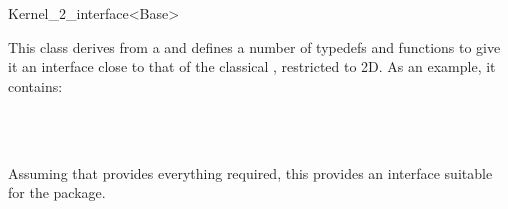 \begin{ccRefClass}{Kernel_2_interface<Base>}

\ccDefinition
This class derives from a   and defines a number
of typedefs and functions to give it an interface close to that of the
classical , restricted to 2D. As an example, it contains:

\\
\\

Assuming that  provides everything required, this provides
an interface suitable for the  package.

\end{ccRefClass}
